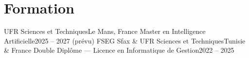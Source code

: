 \section{Formation}
\resumeSubHeadingListStart
    \resumeSubheading
      {UFR Sciences et Techniques}{Le Mans, France}
      {Master en Intelligence Artificielle}{2025 -- 2027 (prévu)}
    \resumeSubheading
      {FSEG Sfax \& UFR Sciences et Techniques}{Tunisie \& France}
      {Double Diplôme — Licence en Informatique de Gestion}{2022 -- 2025}
\resumeSubHeadingListEnd
